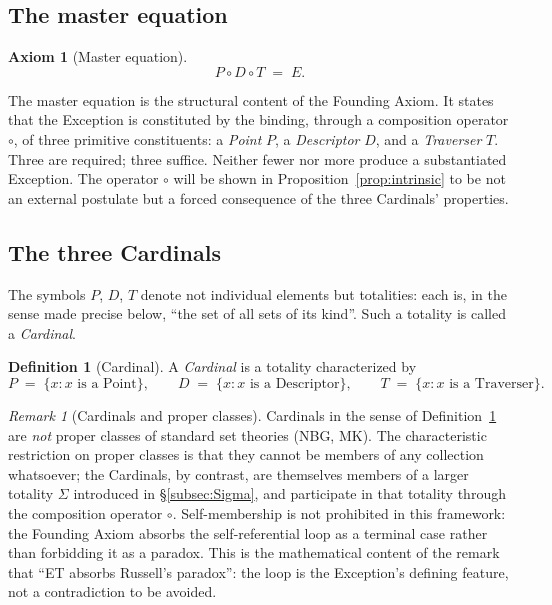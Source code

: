 \documentclass[11pt,a4paper]{article}
\theoremstyle{definition}
\newtheorem{definition}[theorem]{Definition}
\newtheorem{axiom}[theorem]{Axiom}
\theoremstyle{remark}
\newtheorem{remark}[theorem]{Remark}
\begin{document}
\subsection{The master equation}

\begin{axiom}[Master equation]\label{ax:master}
\[
\boxed{\;P \circ D \circ T \;=\; E.\;}
\]
\end{axiom}

The master equation is the structural content of the Founding Axiom. It states that the Exception is constituted by the binding, through a composition operator $\circ$, of three primitive constituents: a \emph{Point} $P$, a \emph{Descriptor} $D$, and a \emph{Traverser} $T$. Three are required; three suffice. Neither fewer nor more produce a substantiated Exception. The operator $\circ$ will be shown in Proposition~\ref{prop:intrinsic} to be not an external postulate but a forced consequence of the three Cardinals' properties.

\subsection{The three Cardinals}

The symbols $P$, $D$, $T$ denote not individual elements but totalities: each is, in the sense made precise below, ``the set of all sets of its kind''. Such a totality is called a \emph{Cardinal}.

\begin{definition}[Cardinal]\label{def:cardinal}
A \emph{Cardinal} is a totality characterized by
\[
P \;=\; \{x : x \text{ is a Point}\}, \qquad
D \;=\; \{x : x \text{ is a Descriptor}\}, \qquad
T \;=\; \{x : x \text{ is a Traverser}\}.
\]
\end{definition}

\begin{remark}[Cardinals and proper classes]\label{rem:propclass}
Cardinals in the sense of Definition~\ref{def:cardinal} are \emph{not} proper classes of standard set theories (NBG, MK). The characteristic restriction on proper classes is that they cannot be members of any collection whatsoever; the Cardinals, by contrast, are themselves members of a larger totality $\Sigma$ introduced in \S\ref{subsec:Sigma}, and participate in that totality through the composition operator $\circ$. Self-membership is not prohibited in this framework: the Founding Axiom absorbs the self-referential loop as a terminal case rather than forbidding it as a paradox. This is the mathematical content of the remark that ``ET absorbs Russell's paradox'': the loop is the Exception's defining feature, not a contradiction to be avoided.
\end{remark}
\end{document}
